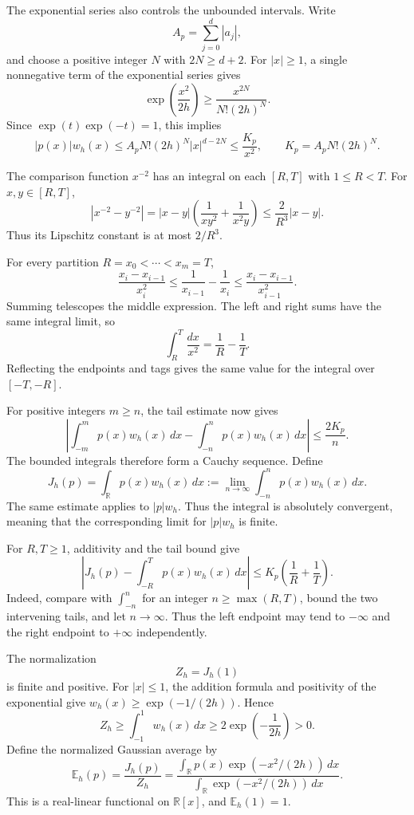 The exponential series also controls the unbounded intervals.
Write
\[
 A_p=\sum_{j=0}^d|a_j|,
\]
and choose a positive integer $N$ with $2N\geq d+2$.
For $|x|\geq1$, a single nonnegative term of the exponential series gives
\[
 \exp\!\left(\frac{x^2}{2h}\right)
 \geq\frac{x^{2N}}{N!(2h)^N}.
\]
Since $\exp(t)\exp(-t)=1$, this implies
\begin{equation}
 \label{eq:gaussian-polynomial-tail}
 |p(x)|w_h(x)
 \leq A_pN!(2h)^N|x|^{d-2N}
 \leq\frac{K_p}{x^2},
 \qquad
 K_p=A_pN!(2h)^N.
\end{equation}

The comparison function $x^{-2}$ has an integral on each $[R,T]$
with $1\leq R<T$.
For $x,y\in[R,T]$,
\[
 |x^{-2}-y^{-2}|
 =|x-y|\left(\frac1{xy^2}+\frac1{x^2y}\right)
 \leq\frac2{R^3}|x-y|.
\]
Thus its Lipschitz constant is at most $2/R^3$.

For every partition $R=x_0<\cdots<x_m=T$,
\[
 \frac{x_i-x_{i-1}}{x_i^2}
 \leq
 \frac1{x_{i-1}}-\frac1{x_i}
 \leq
 \frac{x_i-x_{i-1}}{x_{i-1}^2}.
\]
Summing telescopes the middle expression.
The left and right sums have the same integral limit, so
\[
 \int_R^T\frac{dx}{x^2}=\frac1R-\frac1T.
\]
Reflecting the endpoints and tags gives the same value for the integral
over $[-T,-R]$.

For positive integers $m\geq n$, the tail estimate now gives
\[
 \left|
 \int_{-m}^m p(x)w_h(x)\,dx
 -
 \int_{-n}^n p(x)w_h(x)\,dx
 \right|
 \leq\frac{2K_p}{n}.
\]
The bounded integrals therefore form a Cauchy sequence.
Define
\[
 J_h(p)=\int_{\mathbb R}p(x)w_h(x)\,dx
       :=\lim_{n\to\infty}\int_{-n}^n p(x)w_h(x)\,dx.
\]
The same estimate applies to $|p|w_h$.
Thus the integral is absolutely convergent, meaning that the corresponding
limit for $|p|w_h$ is finite.

For $R,T\geq1$, additivity and the tail bound give
\[
 \left|J_h(p)-\int_{-R}^{T}p(x)w_h(x)\,dx\right|
 \leq K_p\left(\frac1R+\frac1T\right).
\]
Indeed, compare with $\int_{-n}^n$ for an integer $n\geq\max(R,T)$,
bound the two intervening tails, and let $n\to\infty$.
Thus the left endpoint may tend to $-\infty$ and the right endpoint
to $+\infty$ independently.

The normalization
\[
 Z_h=J_h(1)
\]
is finite and positive.
For $|x|\leq1$, the addition formula and positivity of the exponential give
$w_h(x)\geq\exp(-1/(2h))$.
Hence
\[
 Z_h\geq\int_{-1}^1w_h(x)\,dx
     \geq2\exp\!\left(-\frac1{2h}\right)>0.
\]
Define the normalized Gaussian average by
\begin{equation}
 \label{eq:gaussian-real-average}
 \mathbb E_h(p)
 =\frac{J_h(p)}{Z_h}
 =\frac{\displaystyle\int_{\mathbb R}p(x)
                 \exp(-x^2/(2h))\,dx}
        {\displaystyle\int_{\mathbb R}
                 \exp(-x^2/(2h))\,dx}.
\end{equation}
This is a real-linear functional on $\mathbb R[x]$, and
$\mathbb E_h(1)=1$.

